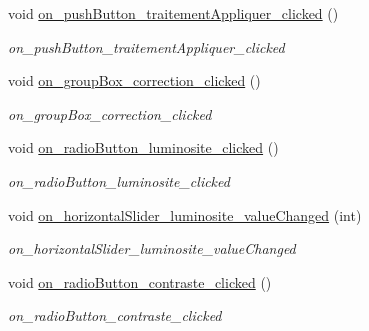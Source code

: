 \begin{DoxyCompactItemize}
\mbox{\label{classMainWindow_a95dfac4432df7db5a514e297568d9c4b}} 
void \hyperlink{classMainWindow_a95dfac4432df7db5a514e297568d9c4b}{on\+\_\+push\+Button\+\_\+traitement\+Appliquer\+\_\+clicked} ()
\begin{DoxyCompactList}\small\item\em on\+\_\+push\+Button\+\_\+traitement\+Appliquer\+\_\+clicked \end{DoxyCompactList}\item 
\mbox{\label{classMainWindow_af6a18794abeab4023d0c80e287c7f27c}} 
void \hyperlink{classMainWindow_af6a18794abeab4023d0c80e287c7f27c}{on\+\_\+group\+Box\+\_\+correction\+\_\+clicked} ()
\begin{DoxyCompactList}\small\item\em on\+\_\+group\+Box\+\_\+correction\+\_\+clicked \end{DoxyCompactList}\item 
\mbox{\label{classMainWindow_a46cfe3aff7aa1b223f0b34aaf251e351}} 
void \hyperlink{classMainWindow_a46cfe3aff7aa1b223f0b34aaf251e351}{on\+\_\+radio\+Button\+\_\+luminosite\+\_\+clicked} ()
\begin{DoxyCompactList}\small\item\em on\+\_\+radio\+Button\+\_\+luminosite\+\_\+clicked \end{DoxyCompactList}\item 
\mbox{\label{classMainWindow_a049310c5a29f1b9b0a948e08865ac470}} 
void \hyperlink{classMainWindow_a049310c5a29f1b9b0a948e08865ac470}{on\+\_\+horizontal\+Slider\+\_\+luminosite\+\_\+value\+Changed} (int)
\begin{DoxyCompactList}\small\item\em on\+\_\+horizontal\+Slider\+\_\+luminosite\+\_\+value\+Changed \end{DoxyCompactList}\item 
\mbox{\label{classMainWindow_ad38ae230bebcd4dc68b5a2fe5c18cf4b}} 
void \hyperlink{classMainWindow_ad38ae230bebcd4dc68b5a2fe5c18cf4b}{on\+\_\+radio\+Button\+\_\+contraste\+\_\+clicked} ()
\begin{DoxyCompactList}\small\item\em on\+\_\+radio\+Button\+\_\+contraste\+\_\+clicked \end{DoxyCompactList}\item 

\end{DoxyCompactItemize}
